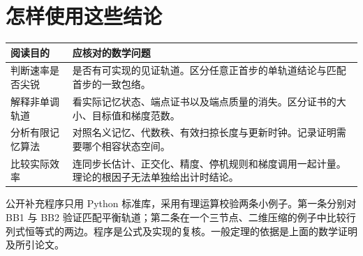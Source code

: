 \documentclass[UTF8,zihao=-4,a4paper]{ctexart}
\begin{document}
\section{怎样使用这些结论}

\begin{tabularx}{\linewidth}{@{}p{.22\linewidth}X@{}}
\toprule
阅读目的& 应核对的数学问题\\\midrule
判断速率是否尖锐 & 是否有可实现的见证轨道。区分任意正首步的单轨道结论与匹配首步的一致包络。\\
解释非单调轨道 & 看实际记忆状态、端点证书以及端点质量的消失。区分证书的大小、目标值和梯度范数。\\
分析有限记忆算法 & 对照名义记忆、代数秩、有效扫掠长度与更新时钟。记录证明需要哪个相容状态空间。\\
比较实际效率 & 连同步长估计、正交化、精度、停机规则和梯度调用一起计量。理论的根因子无法单独给出计时结论。\\
\bottomrule
\end{tabularx}

公开补充程序只用 Python 标准库，采用有理运算校验两条小例子。第一条分别对 BB1 与 BB2 验证匹配平衡轨道；第二条在一个三节点、二维压缩的例子中比较行列式恒等式的两边。程序是公式及实现的复核。一般定理的依据是上面的数学证明及所引论文。
\end{document}
